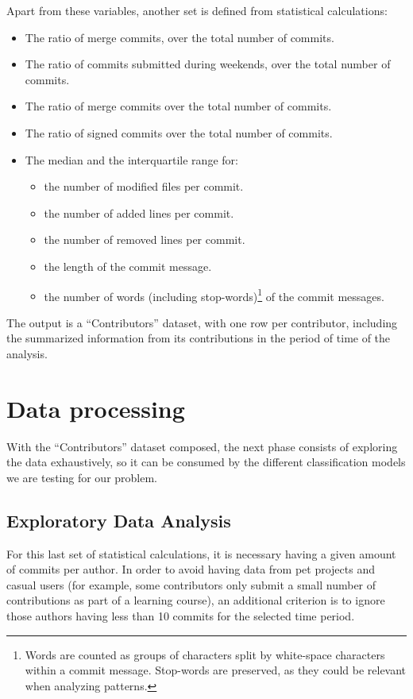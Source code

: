 \documentclass[a4paper, 12pt]{book}
\begin{document}
Apart from these variables, another set is defined from statistical calculations:
\begin{itemize}
\item The ratio of merge commits, over the total number of commits.
\item The ratio of commits submitted during weekends, over the total number of commits.
\item The ratio of merge commits over the total number of commits.
\item The ratio of signed commits over the total number of commits.
\item The median and the interquartile range for:
    \begin{itemize}
    \item the number of modified files per commit.
    \item the number of added lines per commit.
    \item the number of removed lines per commit.
    \item the length of the commit message.
    \item the number of words (including stop-words)\footnote{Words are counted as groups of characters split by white-space characters within a commit message. Stop-words are preserved, as they could be relevant when analyzing patterns.} of the commit messages.
    \end{itemize}
\end{itemize}

The output is a ``Contributors'' dataset, with one row per contributor, including the summarized information from its contributions in the period of
time of the analysis.

\section{Data processing} 
\label{sec:data-processing}

With the ``Contributors'' dataset composed, the next phase consists of exploring the data exhaustively, so it can be consumed by the different classification models we are testing for our problem.

\subsection{Exploratory Data Analysis}
\label{ssec:eda}

For this last set of statistical calculations, it is necessary having a given amount of commits per author. In order to avoid having data from pet projects and casual users (for example, some contributors only submit a small number of contributions as part of a learning course), an additional criterion is to ignore those authors having less than 10 commits for the selected time period. 
\end{document}
